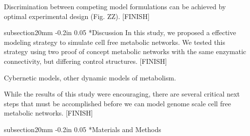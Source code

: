 \documentclass[12pt]{article}
\makeatletter
\renewcommand\section{\@startsection
	{subsection}{2}{0mm}
	{-0.2in}
	{0.05\baselineskip}
	{\normalfont\large\bfseries}}
\makeatother
\begin{document}
Discrimination between competing model formulations can be achieved by optimal experimental design (Fig. ZZ). [FINISH]



\clearpage

\section*{Discussion}
In this study, we proposed a effective modeling strategy to simulate cell free metabolic networks. 
We tested this strategy using two proof of concept metabolic networks 
with the same enzymatic connectivity, but differing control structures. [FINISH]

Cybernetic models, other dynamic models of metabolism. 

While the results of this study were encouraging, there are several critical next steps that must be accomplished before we can model genome scale cell free metabolic networks.
[FINISH]

\section*{Materials and Methods}
\end{document}
